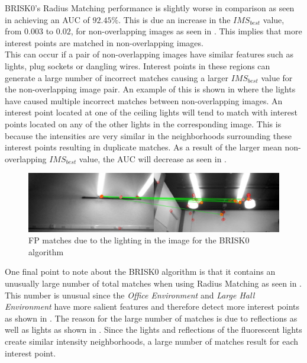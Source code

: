 \documentclass[11pt]{report}
\begin{document}
BRISK0's Radius Matching performance is slightly worse in comparison as seen in  achieving an AUC of $92.45\%$. This is due an increase in the $IMS_{best}$ value, from $0.003$ to $0.02$, for non-overlapping images as seen in . This implies that more interest points are matched in non-overlapping images.\\

This can occur if a pair of non-overlapping images have similar features such as lights, plug sockets or dangling wires. Interest points in these regions can generate a large number of incorrect matches causing a larger $IMS_{best}$ value for the non-overlapping image pair. An example of this is shown in  where the lights have caused multiple incorrect matches between non-overlapping images. An interest point located at one of the ceiling lights will tend to match with interest points located on any of the other lights in the corresponding image. This is because the intensities are very similar in the neighborhoods surrounding these interest points resulting in duplicate matches. As a result of the larger mean non-overlapping $IMS_{best}$ value, the AUC will decrease as seen in .\\

\begin{figure}
  \centering
    \includegraphics[width=1.0\textwidth]{../Drawings/Matching/fpMatchBRISK0.jpg}
    \caption{FP matches due to the lighting in the image for the BRISK0 algorithm} 
    \label{fig:duplicateMatchesBrisk0}
\end{figure}

One final point to note about the BRISK0 algorithm is that it contains an unusually large number of total matches when using Radius Matching as seen in . This number is unusual since the \textit{Office Environment} and \textit{Large Hall Environment} have more salient features and therefore detect more interest points as shown in . The reason for the large number of matches is due to reflections as well as lights as shown in . Since the lights and reflections of the fluorescent lights create similar intensity neighborhoods, a large number of  matches result for each interest point.\\
\end{document}
